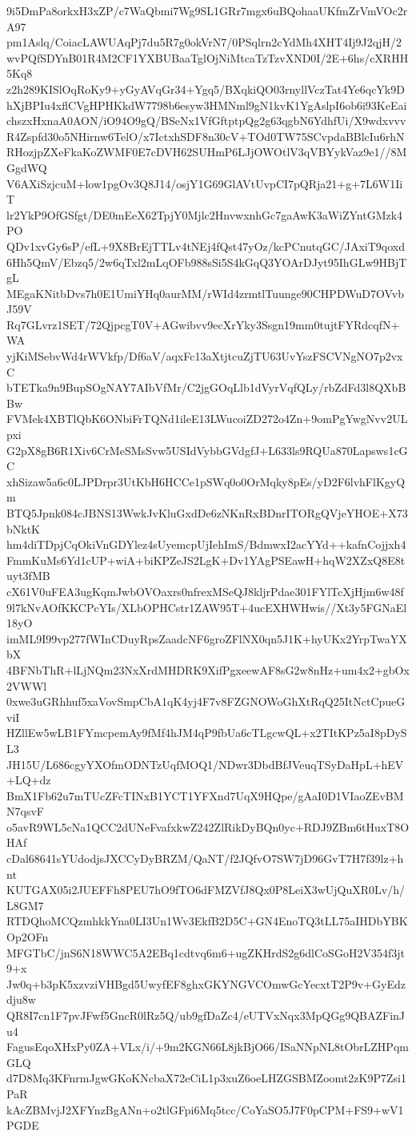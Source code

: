 9i5DmPa8orkxH3xZP/c7WaQbmi7Wg9SL1GRr7mgx6uBQohaaUKfmZrVmVOc2rA97
pm1Aslq/CoiacLAWUAqPj7du5R7g0okVrN7/0PSqlrn2cYdMh4XHT4Ij9J2qjH/2
wvPQfSDYnB01R4M2CF1YXBUBaaTglOjNiMtcaTzTzvXND0I/2E+6hs/cXRHH5Kq8
z2h289KISlOqRoKy9+yGyAVqGr34+Ygq5/BXqkiQO03rnyllVczTat4Ye6qcYk9D
hXjBPIu4xflCVgHPHKkdW7798b6esyw3HMNml9gN1kvK1YgAslpI6ob6i93KeEai
chszxHxnaA0AON/iO94O9gQ/BSeNx1VfGftptpQg2g63qgbN6YdhfUi/X9wdxvvv
R4Zspfd30o5NHirnw6TelO/x7IctxhSDF8n30cV+TOd0TW75SCvpdaBBlcIu6rhN
RHozjpZXeFkaKoZWMF0E7cDVH62SUHmP6LJjOWOtlV3qVBYykVaz9e1//8MGgdWQ
V6AXiSzjcuM+low1pgOv3Q8J14/osjY1G69GlAVtUvpCI7pQRja21+g+7L6W1IiT
lr2YkP9OfGSfgt/DE0mEeX62TpjY0Mjlc2HnvwxnhGc7gaAwK3aWiZYntGMzk4PO
QDv1xvGy6sP/efL+9X8BrEjTTLv4tNEj4fQst47yOz/kcPCnutqGC/JAxiT9qoxd
6Hh5QmV/Ebzq5/2w6qTxl2mLqOFb988sSi5S4kGqQ3YOArDJyt95IhGLw9HBjTgL
MEgaKNitbDvs7h0E1UmiYHq0aurMM/rWId4zrmtlTuunge90CHPDWuD7OVvbJ59V
Rq7GLvrz1SET/72QjpcgT0V+AGwibvv9ecXrYky3Ssgn19mm0tujtFYRdcqfN+WA
yjKiMSebvWd4rWVkfp/Df6aV/aqxFc13aXtjtcuZjTU63UvYszFSCVNgNO7p2vxC
bTETka9n9BupSOgNAY7AIbVfMr/C2jgGOqLlb1dVyrVqfQLy/rbZdFd3l8QXbBBw
FVMek4XBTlQbK6ONbiFrTQNd1ileE13LWucoiZD272o4Zn+9omPgYwgNvv2ULpxi
G2pX8gB6R1Xiv6CrMeSMsSvw5USIdVybbGVdgfJ+L633ls9RQUa870Lapsws1cGC
xhSizaw5a6c0LJPDrpr3UtKbH6HCCe1pSWq0o0OrMqky8pEs/yD2F6lvhFlKgyQm
BTQ5Jpnk084cJBNS13WwkJvKluGxdDe6zNKnRxBDnrITORgQVjeYHOE+X73bNktK
hm4diTDpjCqOkiVnGDYlez4sUyemcpUjIehImS/BdmwxI2acYYd++kafnCojjxh4
FmmKuMs6Yd1cUP+wiA+biKPZeJS2LgK+Dv1YAgPSEawH+hqW2XZxQ8E8tuyt3fMB
cX61V0uFEA3ugKqmJwbOVOaxrs0nfrexMSeQJ8kljrPdae301FYlTcXjHjm6w48f
9l7kNvAOfKKCPcYIs/XLbOPHCstr1ZAW95T+4ucEXHWHwis//Xt3y5FGNaEl18yO
imML9I99vp277fWInCDuyRpsZaadcNF6groZFlNX0qn5J1K+hyUKx2YrpTwaYXbX
4BFNbThR+lLjNQm23NxXrdMHDRK9XifPgxeewAF8sG2w8nHz+um4x2+gbOx2VWWl
0xwe3uGRhhuf5xaVovSmpCbA1qK4yj4F7v8FZGNOWoGhXtRqQ25ItNctCpueGviI
HZllEw5wLB1FYmcpemAy9fMf4hJM4qP9fbUa6cTLgcwQL+x2TItKPz5aI8pDySL3
JH15U/L686cgyYXOfmODNTzUqfMOQ1/NDwr3DbdBfJVeuqTSyDaHpL+hEV+LQ+dz
BmX1Fb62u7mTUcZFcTINxB1YCT1YFXnd7UqX9HQpe/gAaI0D1VIaoZEvBMN7qsvF
o5avR9WL5cNa1QCC2dUNeFvafxkwZ242ZlRikDyBQn0yc+RDJ9ZBm6tHuxT8OHAf
cDal68641sYUdodjsJXCCyDyBRZM/QaNT/f2JQfvO7SW7jD96GvT7H7f39lz+hnt
KUTGAX05i2JUEFFh8PEU7hO9fTO6dFMZVfJ8Qx0P8LeiX3wUjQuXR0Lv/h/L8GM7
RTDQhoMCQzmhkkYna0LI3Un1Wv3EkfB2D5C+GN4EnoTQ3tLL75aIHDbYBKOp2OFn
MFGTbC/jnS6N18WWC5A2EBq1cdtvq6m6+ugZKHrdS2g6dlCoSGoH2V354f3jt9+x
Jw0q+b3pK5xzvziVHBgd5UwyfEF8ghxGKYNGVCOmwGcYecxtT2P9v+GyEdzdju8w
QR8I7cn1F7pvJFwf5GncR0lRz5Q/ub9gfDaZc4/eUTVxNqx3MpQGg9QBAZFinJu4
FagusEqoXHxPy0ZA+VLx/i/+9m2KGN66L8jkBjO66/ISaNNpNL8tObrLZHPqmGLQ
d7D8Mq3KFnrmJgwGKoKNcbaX72eCiL1p3xuZ6oeLHZGSBMZoomt2zK9P7Zsi1PaR
kAcZBMvjJ2XFYnzBgANn+o2tlGFpi6Mq5tcc/CoYaSO5J7F0pCPM+FS9+wV1PGDE

